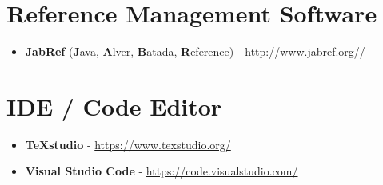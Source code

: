 \begin{appendices}
\section{Reference Management Software}
\begin{itemize}
\item \textbf{JabRef} (\textbf{J}ava, \textbf{A}lver, \textbf{B}atada, \textbf{R}eference) - \url{http://www.jabref.org/}/
\end{itemize}

\section{IDE / Code Editor}
\begin{itemize}
\item \textbf{TeXstudio} - \url{https://www.texstudio.org/}
\item \textbf{Visual Studio Code} - \url{https://code.visualstudio.com/}
\end{itemize}
\end{appendices}